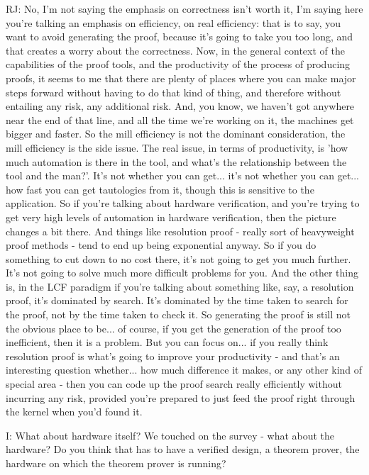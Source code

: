 \documentclass[10pt,titlepage]{book}
\begin{document}
RJ: No, I'm not saying the emphasis on correctness isn't worth it, I'm saying here you're talking an emphasis on efficiency, on real efficiency: that is to say, you want to avoid generating the proof, because it's going to take you too long, and that creates a worry about the correctness.
Now, in the general context of the capabilities of the proof tools, and the productivity of the process of producing proofs, it seems to me that there are plenty of places where you can make major steps forward without having to do that kind of thing, and therefore without entailing any risk, any additional risk.
And, you know, we haven't got anywhere near the end of that line, and all the time we're working on it, the machines get bigger and faster.
So the mill efficiency is not the dominant consideration, the mill efficiency is the side issue. 
The real issue, in terms of productivity, is 'how much automation is there in the tool, and what's the relationship between the tool and the man?'.
It's not whether you can get... it's not whether you can get... how fast you can get tautologies from it, though this is sensitive to the application.
So if you're talking about hardware verification, and you're trying to get very high levels of automation in hardware verification, then the picture changes a bit there.
And things like resolution proof - really sort of heavyweight proof methods - tend to end up being exponential anyway.
So if you do something to cut down to no cost there, it's not going to get you much further.
It's not going to solve much more difficult problems for you.
And the other thing is, in the LCF paradigm if you're talking about something like, say, a resolution proof, it's dominated by search.
It's dominated by the time taken to search for the proof, not by the time taken to check it.
So generating the proof is still not the obvious place to be... of course, if you get the generation of the proof too inefficient, then it is a problem.
But you can focus on... if you really think resolution proof is what's going to improve your productivity - and that's an interesting question whether... how much difference it makes, or any other kind of special area - then you can code up the proof search really efficiently without incurring any risk, provided you're prepared to just feed the proof right through the kernel when you'd found it.

I: What about hardware itself?
We touched on the survey - what about the hardware?
Do you think that has to have a verified design, a theorem prover, the hardware on which the theorem prover is running?
\end{document}
